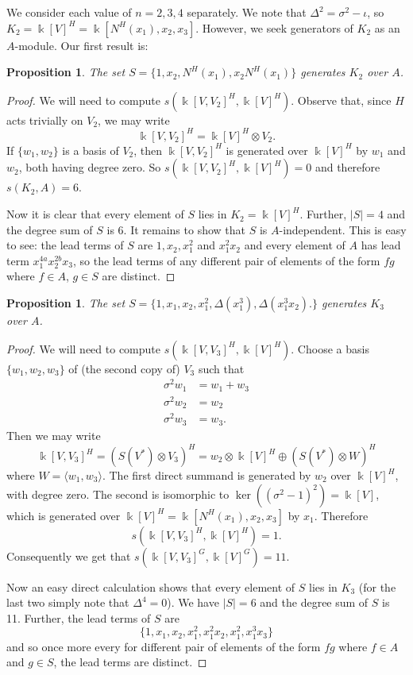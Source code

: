 \documentclass[a4paper]{amsart}
\newcommand{\kk}{\Bbbk}
\newtheorem{prop}[Lemma]{Proposition}
\newtheorem*{Corollary of Conjecture}{Corollary of Conjecture}
\theoremstyle{definition}
\theoremstyle{remark}
\theoremstyle{Acknowledgments}
\begin{document}
We consider each value of $n=2,3,4$ separately. We note that $\Delta^2 = \sigma^2-\iota$, so $K_2 = \kk[V]^H = \kk[N^H(x_1),x_2,x_3]$. However, we seek generators of $K_2$ as an $A$-module. Our first result is:

\begin{prop}
The set $S = \{1,x_2,N^H(x_1),x_2N^H(x_1)\}$ generates $K_2$ over $A$.
\end{prop}

\begin{proof}
We will need to compute $s(\kk[V,V_2]^H, \kk[V]^H)$. Observe that, since $H$ acts trivially on $V_2$,  we may write
\[\kk[V,V_2]^H = \kk[V]^H \otimes V_2.\]
If $\{w_1,w_2\}$ is a basis of $V_2$, then $\kk[V,V_2]^H$ is generated over $\kk[V]^H$ by $w_1$ and $w_2$, both having degree zero. So $s(\kk[V,V_2]^H, \kk[V]^H) = 0$ and therefore $s(K_2,A) = 6$.

Now it is clear that every element of $S$ lies in $K_2 = \kk[V]^H$. Further, $|S|=4$ and the degree sum of $S$ is 6. It remains to show that $S$ is $A$-independent. This is easy to see: the lead terms of $S$ are $1,x_2,x_1^2$ and $x_1^2x_2$ and every element of $A$ has lead term $x_1^{4a}x_2^{2b}x_3$, so the lead terms of any different pair of elements of the form $fg$ where $f \in A$, $g \in S$ are distinct.
\end{proof}

\begin{prop}
The set $S = \{1,x_1,x_2,x_1^2,\Delta(x_1^3), \Delta(x_1^3x_2).\}$ generates $K_3$ over $A$.
\end{prop}

\begin{proof} 
We will need to compute $s(\kk[V,V_3]^H, \kk[V]^H)$. Choose a basis $\{w_1,w_2,w_3\}$ of (the second copy of) $V_3$ such that\begin{align*}\sigma^2 w_1 &= w_1+w_3\\
\sigma^2 w_2 &= w_2\\
\sigma^2 w_3 &= w_3. \end{align*}
Then we may write
\[\kk[V,V_3]^H = (S(V^*) \otimes V_3)^H = w_2 \otimes \kk[V]^H \oplus (S(V^*) \otimes W)^H\] 
where $W = \langle w_1,w_3 \rangle$.
The first direct summand is generated by $w_2$ over $\kk[V]^H$, with degree zero. The second is isomorphic to $\ker((\sigma^2-1)^2) = \kk[V]$, which is generated over $\kk[V]^H = \kk[N^H(x_1),x_2,x_3]$ by $x_1$. Therefore $$s(\kk[V,V_3]^H, \kk[V]^H) = 1.$$ Consequently we get that $s(\kk[V,V_3]^G, \kk[V]^G) = 11$.

Now an easy direct calculation shows that every element of $S$ lies in $K_3$ (for the last two simply note that $\Delta^4 = 0$). We have $|S| = 6$ and the degree sum of $S$ is 11. Further, the lead terms of $S$ are
\[\{1,x_1,x_2,x_1^2,x_1^2x_2,x_1^2,x_1^3x_3\}\] and so once more every for different pair of elements of the form $fg$ where $f \in A$ and $g \in S$, the lead terms are distinct. 
\end{proof}
\end{document}
